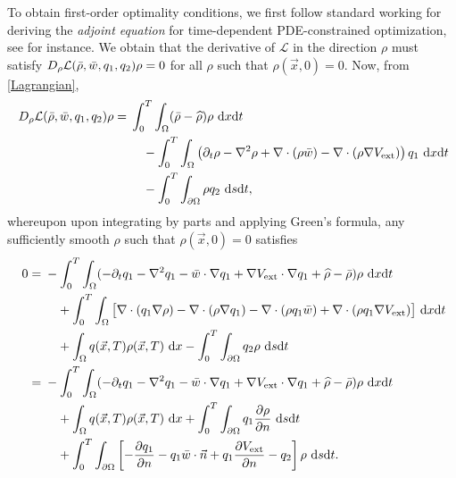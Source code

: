 To obtain first-order optimality conditions, we first follow standard working for deriving the \emph{adjoint equation} for time-dependent PDE-constrained optimization, see \cite[Chapter 3]{Troeltzsch} for instance. We obtain that the derivative of $\mathcal{L}$ in the direction $\rho$ must satisfy $D_{\rho}\mathcal{L}(\bar{\rho},\bar{w},q_1,q_2)\rho=0$ for all $\rho$ such that $\rho(\vec{x},0)=0$. Now, from \eqref{Lagrangian},
\begin{align*}
\ D_{\rho}\mathcal{L}(\bar{\rho},\bar{w},\adj_1,\adj_2)\rho={}&\int_0^T\int_{\Omega}(\bar{\rho}-\widehat{\rho})\rho~{\rm d}x{\rm d}t \\
\ &\quad-\int_0^T\int_{\Omega}\left(\partial_{t}\rho-\nabla^{2}\rho+\nabla\cdot(\rho\bar{w})-\nabla\cdot(\rho\nabla{}V_{\text{ext}})\right)\adj_1~{\rm d}x{\rm d}t \\
\ &\quad-\int_0^T\int_{\partial\Omega}\rho{}\adj_2~{\rm d}s{\rm d}t,
\end{align*}
whereupon upon integrating by parts and applying Green's formula, any sufficiently smooth $\rho$ such that $\rho(\vec{x},0)=0$ satisfies
\begin{align}
\ \nonumber 0={}&-\int_0^T\int_{\Omega}(-\partial_{t}\adj_{1}-\nabla^{2}\adj_{1}-\bar{w}\cdot\nabla{}\adj_{1}+\nabla{}V_{\text{ext}}\cdot\nabla{}\adj_{1}+\widehat{\rho}-\bar{\rho})\rho~{\rm d}x{\rm d}t \\
\ \nonumber &\quad+\int_0^T\int_{\Omega}\big[\nabla\cdot(\adj_{1}\nabla\rho)-\nabla\cdot(\rho\nabla{}\adj_{1})-\nabla\cdot(\rho{}\adj_{1}\bar{w})+\nabla\cdot(\rho{}\adj_{1}\nabla{}V_{\text{ext}})\big]~{\rm d}x{\rm d}t \\
\ \nonumber &\quad+\int_{\Omega}\adj(\vec{x},T)\rho(\vec{x},T)~{\rm d}x-\int_0^T\int_{\partial\Omega}\adj_2\rho~{\rm d}s{\rm d}t \\
\ \label{OptCondrho} ={}&-\int_0^T\int_{\Omega}(-\partial_{t}\adj_{1}-\nabla^{2}\adj_{1}-\bar{w}\cdot\nabla{}\adj_{1}+\nabla{}V_{\text{ext}}\cdot\nabla{}\adj_{1}+\widehat{\rho}-\bar{\rho})\rho~{\rm d}x{\rm d}t \\
\ \nonumber &\quad+\int_{\Omega}\adj(\vec{x},T)\rho(\vec{x},T)~{\rm d}x+\int_0^T\int_{\partial\Omega}\adj_1\frac{\partial\rho}{\partial{}n}~{\rm d}s{\rm d}t \\
\ \nonumber &\quad+\int_0^T\int_{\partial\Omega}\left[-\frac{\partial{}\adj_1}{\partial{}n}-\adj_{1}\bar{w}\cdot\vec{n}+\adj_{1}\frac{\partial{}V_{\text{ext}}}{\partial{}n}-\adj_2\right]\rho~{\rm d}s{\rm d}t.
\end{align}


